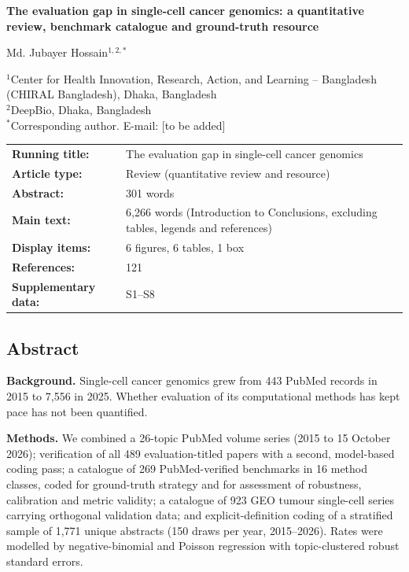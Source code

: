 \documentclass[11pt]{article}
\begin{document}
\begin{titlepage}
\nolinenumbers\noindent
{\LARGE\bfseries The evaluation gap in single-cell cancer genomics: a quantitative review, benchmark catalogue and ground-truth resource\par}
\vspace{1.5em}\noindent
{\large Md. Jubayer Hossain$^{1,2,*}$\par}
\vspace{0.8em}\noindent
{\small $^{1}$Center for Health Innovation, Research, Action, and Learning -- Bangladesh (CHIRAL Bangladesh), Dhaka, Bangladesh\\
$^{2}$DeepBio, Dhaka, Bangladesh\\[0.4em]
$^{*}$Corresponding author. E-mail: [to be added]\par}
\vspace{1.5em}
\noindent\begin{tabular}{@{}lp{}@{}}
\textbf{Running title:} & The evaluation gap in single-cell cancer genomics\\
\textbf{Article type:} & Review (quantitative review and resource)\\
\textbf{Abstract:} & 301 words\\
\textbf{Main text:} & 6,266 words (Introduction to Conclusions, excluding tables, legends and references)\\
\textbf{Display items:} & 6 figures, 6 tables, 1 box\\
\textbf{References:} & 121\\
\textbf{Supplementary data:} & S1--S8\\
\end{tabular}
\end{titlepage}
\subsection{Abstract}\label{abstract}

\textbf{Background.} Single-cell cancer genomics grew from 443 PubMed
records in 2015 to 7,556 in 2025. Whether evaluation of its
computational methods has kept pace has not been quantified.

\textbf{Methods.} We combined a 26-topic PubMed volume series (2015 to
15 October 2026); verification of all 489 evaluation-titled papers with
a second, model-based coding pass; a catalogue of 269 PubMed-verified
benchmarks in 16 method classes, coded for ground-truth strategy and for
assessment of robustness, calibration and metric validity; a catalogue
of 923 GEO tumour single-cell series carrying orthogonal validation
data; and explicit-definition coding of a stratified sample of 1,771
unique abstracts (150 draws per year, 2015--2026). Rates were modelled
by negative-binomial and Poisson regression with topic-clustered robust
standard errors.
\end{document}

